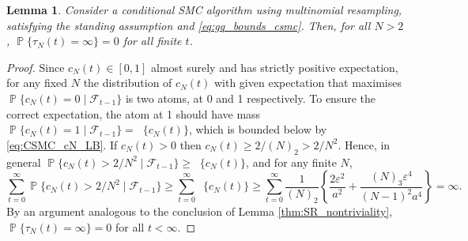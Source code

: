 \documentclass{article}
\newtheorem{lemma}{Lemma}
\theoremstyle{definition}
\DeclareMathOperator{\Prob}{\mathbb{P}}
\DeclareMathOperator{\Et}{\mathbb{E}_t}
\newcommand{\1}[1]{\mathbbm{1}_{\{#1\}}}
\begin{document}
\begin{lemma}\label{thm:CSMC_nontriviality}
Consider a conditional SMC algorithm using multinomial resampling, satisfying the standing assumption and \eqref{eq:gq_bounds_csmc}. 
Then, for all $N>2$, $\Prob\{ \tau_N(t) = \infty \}=0$ for all finite $t$.
\end{lemma}

\begin{proof}
Since $c_N(t) \in [0,1]$ almost surely and has strictly positive expectation, for any fixed $N$ the distribution of $c_N(t)$ with given expectation that maximises $\Prob\{ c_N(t)=0 \mid \mathcal{F}_{t-1} \}$ is two atoms, at 0 and 1 respectively. To ensure the correct expectation, the atom at 1 should have mass $\Prob\{ c_N(t)=1 \mid \mathcal{F}_{t-1} \} = \Et \{c_N(t)\}$, which is bounded below by \eqref{eq:CSMC_cN_LB}.
If $c_N(t) > 0$ then $c_N(t) \geq 2/(N)_2 > 2/N^2$. Hence, in general $\Prob\{ c_N(t) > 2/N^2 \mid \mathcal{F}_{t-1} \} \geq \Et \{c_N(t)\}$, and for any finite $N$,
\begin{equation*}
\sum_{t=0}^\infty \Prob\{ c_N(t) > 2/N^2 \mid \mathcal{F}_{t-1} \}
\geq \sum_{t=0}^\infty \Et \{c_N(t)\}
\geq \sum_{t=0}^\infty \frac{1}{(N)_2} \left\{ \frac{2\varepsilon^2}{a^2} + \frac{(N)_3 \varepsilon^4}{(N-1)^2 a^4} \right\}
= \infty .
\end{equation*}
By an argument analogous to the conclusion of Lemma \ref{thm:SR_nontriviality}, $\Prob\{ \tau_N(t) = \infty \} =0$ for all $t < \infty$.
\end{proof}
\end{document}
